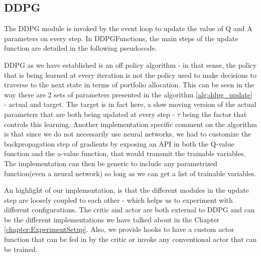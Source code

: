 \subsection{DDPG}
The DDPG module is invoked by the event loop to update the value of Q and A parameters on every step.  In DDPGFunctions, the main steps of the update function are detailed in the following pseudocode.



DDPG as we have established is an off policy algorithm - in that sense, the policy that is being learned at every iteration  is not the policy used to make decisions to traverse to the next state in terms of portfolio allocation. This can be seen in the way there are 2 sets of parameters presented in the algorithm \ref{alg:ddpg_update} - actual and target. The target is in fact here, a slow moving version of the actual parameters that are both being updated at every step - $\tau$ being the factor that controls this learning. Another implementation specific comment on the algorithm is that since we do not necessarily use neural networks, we had to customize the backpropagation step of gradients by exposing an API in both the Q-value function and the a-value function, that would transmit the trainable variables. The implementation can then be generic to include any parametrized function(even a neural network) so long as we can get a list of trainable variables. 


An highlight of our implementation, is that the different modules in the update step are loosely coupled to each other - which helps us to experiment with different configurations. The critic and actor are both external to DDPG and can be the different implementations we have talked about in the Chapter \ref{chapter:ExperimentSetup}. Also, we provide hooks to have a custom actor function that can be fed in by the critic or invoke any conventional actor that can be trained.


